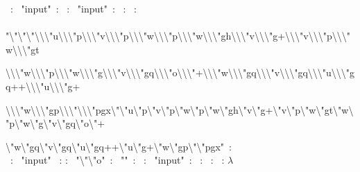 \begin{smurf}
\footnotesize
\StmInput~: \StmPush~"input"~: \StmPut~:
\StmPush~"input"~: \StmGet~: \StmQuotify~:\\ \StmPush~
"\textbackslash{}"\textbackslash{}"\textbackslash{}"\textbackslash{}\textbackslash{}\textbackslash{}"u\textbackslash{}\textbackslash{}\textbackslash{}"p\textbackslash{}\textbackslash{}\textbackslash{}"v\textbackslash{}\textbackslash{}\textbackslash{}"p\textbackslash{}\textbackslash{}\textbackslash{}"w\textbackslash{}\textbackslash{}\textbackslash{}"p\textbackslash{}\textbackslash{}\textbackslash{}"w\textbackslash{}\textbackslash{}\textbackslash{}"gh\textbackslash{}\textbackslash{}\textbackslash{}"v\textbackslash{}\textbackslash{}\textbackslash{}"g+\textbackslash{}\textbackslash{}\textbackslash{}"v\textbackslash{}\textbackslash{}\textbackslash{}"p\textbackslash{}\textbackslash{}\textbackslash{}"w\textbackslash{}\textbackslash{}\textbackslash{}"gt

\textbackslash{}\textbackslash{}\textbackslash{}"w\textbackslash{}\textbackslash{}\textbackslash{}"p\textbackslash{}\textbackslash{}\textbackslash{}"w\textbackslash{}\textbackslash{}\textbackslash{}"g\textbackslash{}\textbackslash{}\textbackslash{}"v\textbackslash{}\textbackslash{}\textbackslash{}"gq\textbackslash{}\textbackslash{}\textbackslash{}"o\textbackslash{}\textbackslash{}\textbackslash{}"+\textbackslash{}\textbackslash{}\textbackslash{}"w\textbackslash{}\textbackslash{}\textbackslash{}"gq\textbackslash{}\textbackslash{}\textbackslash{}"v\textbackslash{}\textbackslash{}\textbackslash{}"gq\textbackslash{}\textbackslash{}\textbackslash{}"u\textbackslash{}\textbackslash{}\textbackslash{}"gq++\textbackslash{}\textbackslash{}\textbackslash{}"u\textbackslash{}\textbackslash{}\textbackslash{}"g+

\textbackslash{}\textbackslash{}\textbackslash{}"w\textbackslash{}\textbackslash{}\textbackslash{}"gp\textbackslash{}\textbackslash{}\textbackslash{}"\textbackslash{}\textbackslash{}\textbackslash{}"pgx\textbackslash{}"\textbackslash{}"u\textbackslash{}"p\textbackslash{}"v\textbackslash{}"p\textbackslash{}"w\textbackslash{}"p\textbackslash{}"w\textbackslash{}"gh\textbackslash{}"v\textbackslash{}"g+\textbackslash{}"v\textbackslash{}"p\textbackslash{}"w\textbackslash{}"gt\textbackslash{}"w\textbackslash{}"p\textbackslash{}"w\textbackslash{}"g\textbackslash{}"v\textbackslash{}"gq\textbackslash{}"o\textbackslash{}"+

\textbackslash{}"w\textbackslash{}"gq\textbackslash{}"v\textbackslash{}"gq\textbackslash{}"u\textbackslash{}"gq++\textbackslash{}"u\textbackslash{}"g+\textbackslash{}"w\textbackslash{}"gp\textbackslash{}"\textbackslash{}"pgx"~:
\\
\StmCat~: \StmPush~"input" \StmGet~: \StmPut
: \StmPush~"\textbackslash{}"\textbackslash{}"o"~: \StmPush~""~: \StmPut~:
\StmPush~"input"~: \StmGet~: \StmGet~: \StmExec~: $\lambda$

\end{smurf}